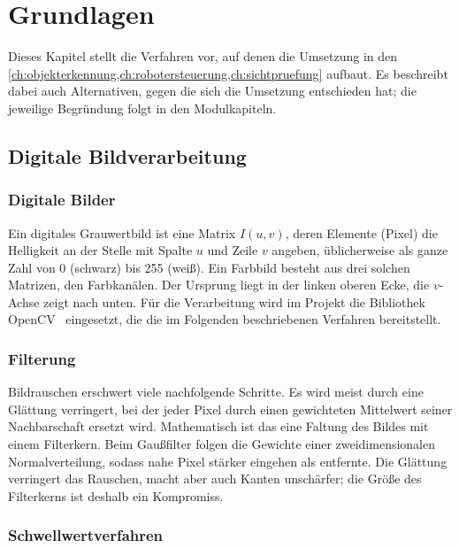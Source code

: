 \chapter{Grundlagen}
\label{ch:grundlagen}

Dieses Kapitel stellt die Verfahren vor, auf denen die Umsetzung in den
\cref{ch:objekterkennung,ch:robotersteuerung,ch:sichtpruefung} aufbaut. Es beschreibt dabei
auch Alternativen, gegen die sich die Umsetzung entschieden hat; die jeweilige Begründung
folgt in den Modulkapiteln.

\section{Digitale Bildverarbeitung}
\label{sec:bildverarbeitung}

\subsection{Digitale Bilder}

Ein digitales Grauwertbild ist eine Matrix $I(u, v)$, deren Elemente (Pixel) die Helligkeit
an der Stelle mit Spalte $u$ und Zeile $v$ angeben, üblicherweise als ganze Zahl von 0
(schwarz) bis 255 (weiß). Ein Farbbild besteht aus drei solchen Matrizen, den Farbkanälen.
Der Ursprung liegt in der linken oberen Ecke, die $v$-Achse zeigt nach unten. Für die
Verarbeitung wird im Projekt die Bibliothek OpenCV~\cite{bradski2000opencv} eingesetzt, die
die im Folgenden beschriebenen Verfahren bereitstellt.

\subsection{Filterung}

Bildrauschen erschwert viele nachfolgende Schritte. Es wird meist durch eine Glättung
verringert, bei der jeder Pixel durch einen gewichteten Mittelwert seiner Nachbarschaft
ersetzt wird. Mathematisch ist das eine Faltung des Bildes mit einem Filterkern. Beim
Gaußfilter folgen die Gewichte einer zweidimensionalen Normalverteilung, sodass nahe Pixel
stärker eingehen als entfernte. Die Glättung verringert das Rauschen, macht aber auch Kanten
unschärfer; die Größe des Filterkerns ist deshalb ein Kompromiss.

\subsection{Schwellwertverfahren}
\label{sec:schwellwert}

